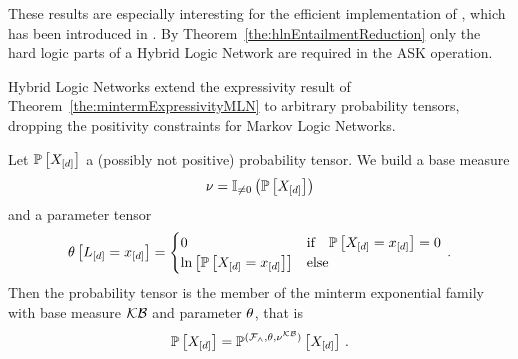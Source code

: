 These results are especially interesting for the efficient implementation of , which has been introduced in .
By Theorem~\ref{the:hlnEntailmentReduction} only the hard logic parts of a Hybrid Logic Network are required in the ASK operation.


Hybrid Logic Networks extend the expressivity result of Theorem~\ref{the:mintermExpressivityMLN} to arbitrary probability tensors, dropping the positivity constraints for Markov Logic Networks.

\begin{theorem}
    \label{the:mintermExpressivityHLN}
    Let $\mathbb{P}\left[X_{[d]}\right]$ a (possibly not positive) probability tensor.
    We build a base measure
    \[ \nu = \mathbb{I}_{\neq0}\left(\mathbb{P}\left[X_{[d]}\right]\right) \]
    and a parameter tensor
    \begin{align*}
        \theta\left[L_{[d]}=x_{[d]}\right]
        = \begin{cases}
              0 & \text{if} \quad \mathbb{P}\left[X_{[d]}=x_{[d]}\right] = 0  \\
              \ln \left[ \mathbb{P}\left[X_{[d]}=x_{[d]}\right] \right] & \text{else}
        \end{cases} \, .
    \end{align*}
    Then the probability tensor is the member of the minterm exponential family with base measure $\mathcal{KB}$ and parameter $\theta$, that is
    \[ \mathbb{P}\left[X_{[d]}\right] = \mathbb{P}^{(\mathcal{F}_{\land},\theta,\nu^{\mathcal{KB}})}\left[X_{[d]}\right] \, . \]
\end{theorem}
